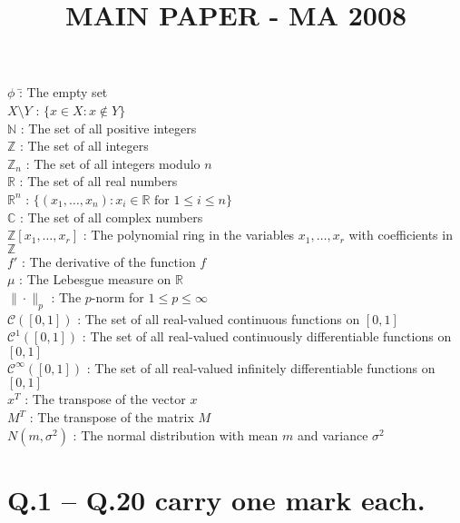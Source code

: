 \documentclass[11pt]{article}
\begin{document}
\begin{tabbing}
    $\phi$ \hspace{2cm} \= : The empty set \\
    $X \setminus Y$ \> : $\{x \in X : x \notin Y\}$ \\
    $\mathbb{N}$ \> : The set of all positive integers \\
    $\mathbb{Z}$ \> : The set of all integers \\
    $\mathbb{Z}_n$ \> : The set of all integers modulo $n$ \\
    $\mathbb{R}$ \> : The set of all real numbers \\
    $\mathbb{R}^n$ \> : $\{(x_1, \dots, x_n) : x_i \in \mathbb{R} \text{ for } 1 \leq i \leq n \}$ \\
    $\mathbb{C}$ \> : The set of all complex numbers \\
    $\mathbb{Z}[x_1, \dots, x_r]$ \> : The polynomial ring in the variables $x_1, \dots, x_r$ with coefficients in $\mathbb{Z}$ \\
    $f'$ \> : The derivative of the function $f$ \\
    $\mu$ \> : The Lebesgue measure on $\mathbb{R}$ \\
    $\| \cdot \|_p$ \> : The $p$-norm for $1 \leq p \leq \infty$ \\
    $\mathcal{C}([0,1])$ \> : The set of all real-valued continuous functions on $[0,1]$ \\
    $\mathcal{C}^1([0,1])$ \> : The set of all real-valued continuously differentiable functions on $[0,1]$ \\
    $\mathcal{C}^\infty([0,1])$ \> : The set of all real-valued infinitely differentiable functions on $[0,1]$ \\
    $x^T$ \> : The transpose of the vector $x$ \\
    $M^T$ \> : The transpose of the matrix $M$ \\
    $N(m, \sigma^2)$ \> : The normal distribution with mean $m$ and variance $\sigma^2$ \\
\end{tabbing}


\title{\textbf{MAIN PAPER - MA 2008}}
\date{}



\maketitle

\section*{Q.1 – Q.20 carry one mark each.}
\end{document}
